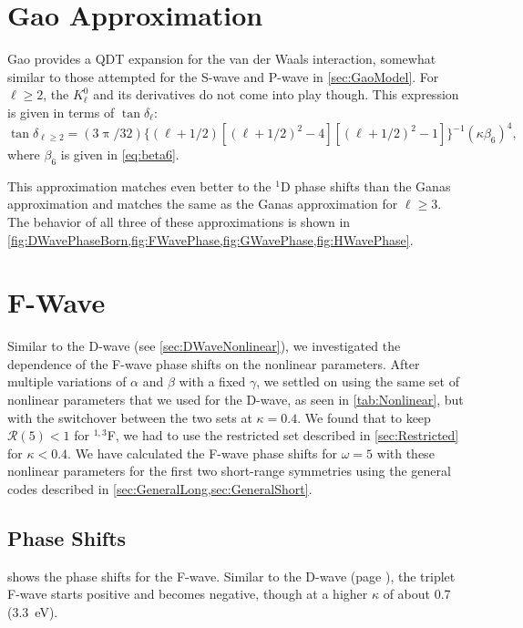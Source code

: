 \documentclass[Dissertation.tex]{subfiles}
\begin{document}
\section{Gao Approximation}
\label{sec:GaoPhase}

Gao \cite{Gao1998a} provides a QDT expansion for the van der Waals interaction,
somewhat similar to those attempted for the S-wave and P-wave in
\cref{sec:GaoModel}. For $\ell \geq 2$, the $K_\ell^0$ and its derivatives
do not come into play though. This expression is given in terms of $\tan\delta_\ell$:
\begin{equation}
\label{eq:GaoPhase}
\tan\delta_{\ell \geq 2} = (3 \uppi / 32) \{(\ell+1/2) [(\ell+1/2)^2 - 4][(\ell+1/2)^2 - 1]\}^{-1} (\kappa \beta_6)^4,
\end{equation}
where $\beta_6$ is given in \cref{eq:beta6}.

This approximation matches even better to the $^1$D phase shifts than the Ganas
approximation and matches the same as the Ganas approximation for $\ell \geq 3$.
The behavior of all three of these approximations is shown in
\cref{fig:DWavePhaseBorn,fig:FWavePhase,fig:GWavePhase,fig:HWavePhase}.


\section{F-Wave}
\label{sec:FWave}

Similar to the D-wave (see \cref{sec:DWaveNonlinear}), we investigated the
dependence of the F-wave phase shifts on the nonlinear parameters.
After multiple variations of $\alpha$ and
$\beta$ with a fixed $\gamma$, we settled on using the same set of nonlinear
parameters that we used for the D-wave, as seen in \cref{tab:Nonlinear}, but
with the switchover between the two sets at $\kappa = 0.4$.
We found that to keep $\mathcal{R}(5) < 1$ for $^{1,3}$F, we had to use the 
restricted set described in \cref{sec:Restricted} for $\kappa < 0.4$.
We have calculated the F-wave phase shifts for $\omega = 5$ with these nonlinear
parameters for the first two short-range symmetries using the general codes
described in \cref{sec:GeneralLong,sec:GeneralShort}.

\label{sec:FNonlinear}

\subsection{Phase Shifts}
\label{sec:FWavePhase}

 shows the phase shifts for the F-wave.
Similar to the D-wave (page \pageref{DWaveSwitch}), the triplet F-wave starts
positive and becomes negative, though at a higher $\kappa$ of about 0.7
(\SI{3.3}{eV}).
\end{document}
